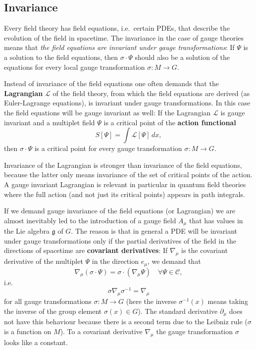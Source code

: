 \documentclass[11pt]{amsart}
\theoremstyle{definition}
\theoremstyle{remark}
\numberwithin{equation}{section}
\begin{document}
\subsection{Invariance}
Every field theory has field equations, i.e.~certain PDEs, that describe the evolution of the field in spacetime. The invariance in the case of gauge theories means that {\em the field equations are invariant under gauge transformations}: If $\Psi$ is a solution to the field equations, then $\sigma\cdot\Psi$ should also be a solution of the equations for every local gauge transformation $\sigma\colon M\rightarrow G$.

Instead of invariance of the field equations one often demands that the {\bf Lagrangian} $\mathcal{L}$ of the field theory, from which the field equations are derived (as Euler-Lagrange equations), is invariant under gauge transformations. In this case the field equations will be gauge invariant as well: If the Lagrangian $\mathcal{L}$ is gauge invariant and a multiplet field $\Psi$ is a critical point of the {\bf action functional}
\begin{equation*}
S[\Psi]=\int\mathcal{L}[\Psi]\,dx,
\end{equation*}
then $\sigma\cdot\Psi$ is a critical point for every gauge transformation $\sigma\colon M\rightarrow G$.

Invariance of the Lagrangian is stronger than invariance of the field equations, because the latter only means invariance of the set of critical points of the action. A gauge invariant Lagrangian is relevant in particular in quantum field theories where the full action (and not just its critical points) appears in path integrals.

If we demand gauge invariance of the field equations (or Lagrangian) we are almost inevitably led to the introduction of a gauge field $A_\mu$ that has values in the Lie algebra $\mathfrak{g}$ of $G$. The reason is that in general a PDE will be invariant under gauge transformations only if the partial derivatives of the field in the directions of spacetime are {\bf covariant derivatives}: If $\nabla_\mu$ is the covariant derivative of the multiplet $\Psi$ in the direction $e_\mu$, we demand that 
\begin{equation*}
\nabla_\mu(\sigma\cdot\Psi)=\sigma\cdot(\nabla_\mu\Psi)\quad\forall\Psi\in\mathcal{C},
\end{equation*}
i.e. 
\begin{equation*}
\sigma\nabla_\mu \sigma^{-1}=\nabla_\mu
\end{equation*} 
for all gauge transformations $\sigma\colon M\rightarrow G$ (here the inverse $\sigma^{-1}(x)$ means taking the inverse of the group element $\sigma(x)\in G$). The standard derivative $\partial_\mu$ does not have this behaviour because there is a second term due to the Leibniz rule ($\sigma$ is a function on $M$). To a covariant derivative $\nabla_\mu$ the gauge transformation $\sigma$ looks like a constant.
 
\end{document}
